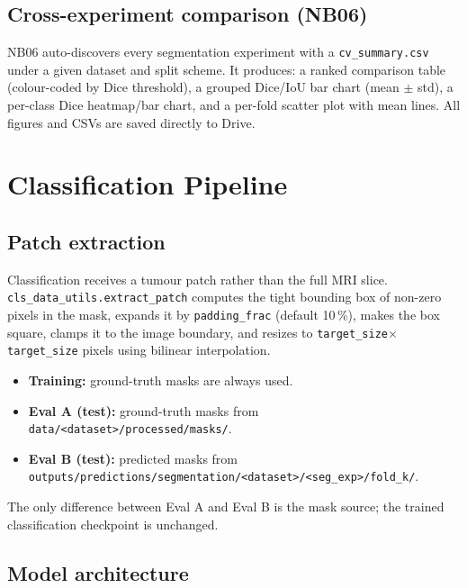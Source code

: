\documentclass[12pt,a4paper]{article}
\begin{document}
\subsection{Cross-experiment comparison (NB06)}

NB06 auto-discovers every segmentation experiment with a \texttt{cv\_summary.csv}
under a given dataset and split scheme.  It produces:
a ranked comparison table (colour-coded by Dice threshold),
a grouped Dice/IoU bar chart (mean $\pm$ std),
a per-class Dice heatmap/bar chart,
and a per-fold scatter plot with mean lines.
All figures and CSVs are saved directly to Drive.

\section{Classification Pipeline}

\subsection{Patch extraction}

Classification receives a tumour patch rather than the full MRI slice.
\texttt{cls\_data\_utils.extract\_patch} computes the tight bounding box of
non-zero pixels in the mask, expands it by \texttt{padding\_frac} (default
10\,\%), makes the box square, clamps it to the image boundary, and resizes to
\texttt{target\_size}$\times$\texttt{target\_size} pixels using bilinear
interpolation.

\begin{itemize}[leftmargin=1.5em]
  \item \textbf{Training:} ground-truth masks are always used.
  \item \textbf{Eval A (test):} ground-truth masks from
    \texttt{data/<dataset>/processed/masks/}.
  \item \textbf{Eval B (test):} predicted masks from
    \texttt{outputs/predictions/segmentation/<dataset>/<seg\_exp>/fold\_k/}.
\end{itemize}

The only difference between Eval A and Eval B is the mask source; the trained
classification checkpoint is unchanged.

\subsection{Model architecture}
\end{document}
